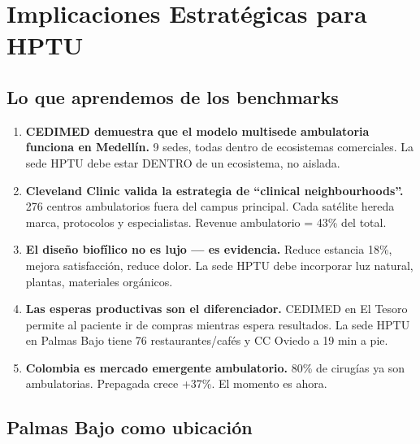 \documentclass[11pt, a4paper]{article}
\newcommand{\fuente}[1]{\par\vspace{2pt}{\scriptsize\textcolor{slate}{Fuente: #1}}}
\begin{document}
\fuente{Google Places API + Google Directions API, marzo 2026}

\section{Implicaciones Estrat\'{e}gicas para HPTU}

\subsection{Lo que aprendemos de los benchmarks}

\begin{enumerate}
  \item \textbf{CEDIMED demuestra que el modelo multisede ambulatoria funciona en Medell\'{i}n.} 9 sedes, todas dentro de ecosistemas comerciales. La sede HPTU debe estar DENTRO de un ecosistema, no aislada.

  \item \textbf{Cleveland Clinic valida la estrategia de ``clinical neighbourhoods''.} 276 centros ambulatorios fuera del campus principal. Cada sat\'{e}lite hereda marca, protocolos y especialistas. Revenue ambulatorio = 43\% del total.

  \item \textbf{El dise\~{n}o biof\'{i}lico no es lujo — es evidencia.} Reduce estancia 18\%, mejora satisfacci\'{o}n, reduce dolor. La sede HPTU debe incorporar luz natural, plantas, materiales org\'{a}nicos.

  \item \textbf{Las esperas productivas son el diferenciador.} CEDIMED en El Tesoro permite al paciente ir de compras mientras espera resultados. La sede HPTU en Palmas Bajo tiene 76 restaurantes/caf\'{e}s y CC Oviedo a 19 min a pie.

  \item \textbf{Colombia es mercado emergente ambulatorio.} 80\% de cirug\'{i}as ya son ambulatorias. Prepagada crece +37\%. El momento es ahora.
\end{enumerate}

\subsection{Palmas Bajo como ubicaci\'{o}n}
\end{document}
